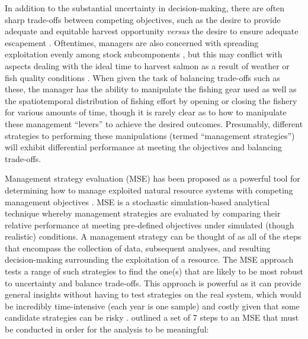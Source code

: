 \documentclass[12pt,]{book}
\theoremstyle{definition}
\theoremstyle{definition}
\theoremstyle{definition}
\theoremstyle{remark}
\begin{document}
In addition to the substantial uncertainty in decision-making, there are
often sharp trade-offs between competing objectives, such as the desire
to provide adequate and equitable harvest opportunity \emph{versus} the
desire to ensure adequate escapement \citep{catalano-jones-2014}.
Oftentimes, managers are also concerned with spreading exploitation
evenly among stock subcomponents \citep{schindler-etal-2010}, but this
may conflict with aspects dealing with the ideal time to harvest salmon
as a result of weather or fish quality conditions
\citep{carney-adkison-2014b, adkison-cunningham-2015}. When given the
task of balancing trade-offs such as these, the manager has the ability
to manipulate the fishing gear used as well as the spatiotemporal
distribution of fishing effort by opening or closing the fishery for
various amounts of time, though it is rarely clear as to how to
manipulate these management ``levers'' to achieve the desired outcomes.
Presumably, different strategies to performing these manipulations
(termed ``management strategies'') will exhibit differential performance
at meeting the objectives and balancing trade-offs.

Management strategy evaluation (MSE) has been proposed as a powerful
tool for determining how to manage exploited natural resource systems
with competing management objectives
\citep{cooke-1999, butterworth-2007}. MSE is a stochastic
simulation-based analytical technique whereby management strategies are
evaluated by comparing their relative performance at meeting pre-defined
objectives under simulated (though realistic) conditions. A management
strategy can be thought of as all of the steps that encompass the
collection of data, subsequent analyses, and resulting decision-making
surrounding the exploitation of a resource. The MSE approach tests a
range of such strategies to find the one(s) that are likely to be most
robust to uncertainty and balance trade-offs. This approach is powerful
as it can provide general insights without having to test strategies on
the real system, which would be incredibly time-intensive (each year is
one sample) and costly given that some candidate strategies can be risky
\citep{walters-martell-2004}. \citet{punt-etal-2014} outlined a set of 7
steps to an MSE that must be conducted in order for the analysis to be
meaningful:
\end{document}
